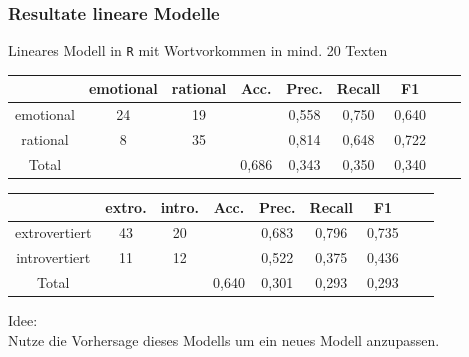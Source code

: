 \begin{frame}
 \frametitle{Resultate lineare Modelle}
Lineares Modell in \texttt{R} mit Wortvorkommen in mind. 20 Texten\\
\vspace{12pt}
\begin{center}
\begin{tabular}{|c|c|c|c|c|c|c|c|c|}
\hline
				& emotional 	& rational	&  Acc.	& Prec. & Recall	& F1\\
\hline
emotional 		& 24			& 19 		&       & 0,558	& 0,750 	& 0,640\\
rational	 	& 8 			& 35		& 		& 0,814	& 0,648 	& 0,722\\
\hline
Total 			& 				& 			& 0,686	& 0,343	& 0,350  	& 0,340\\
\hline
\end{tabular}
\end{center}

\begin{center}
\begin{tabular}{|c|c|c|c|c|c|c|c|c|}
\hline
				& extro. 	& intro.	&  Acc.	& Prec. 	& Recall	& F1\\
\hline
extrovertiert	& 43		& 20		&       & 0,683 	& 0,796 	& 0,735\\
introvertiert 	& 11 		& 12		& 		& 0,522 	& 0,375 	& 0,436\\
\hline
Total 			& 			& 			& 0,640	& 0,301		& 0,293  	& 0,293\\
\hline
\end{tabular}
 \end{center}

 \vspace{12pt}
 
 Idee:\\
 Nutze die Vorhersage dieses Modells um ein neues Modell anzupassen. 
 \end{frame}

